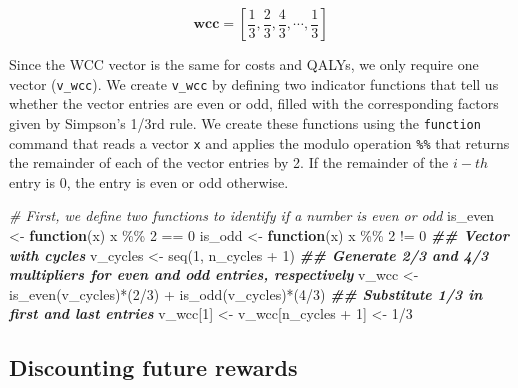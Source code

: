 \documentclass[
]{article}
\newenvironment{Shaded}{\begin{snugshade}}{\end{snugshade}}
\newcommand{\CommentTok}[1]{\textcolor[rgb]{0.56,0.35,0.01}{\textit{#1}}}
\newcommand{\ControlFlowTok}[1]{\textcolor[rgb]{0.13,0.29,0.53}{\textbf{#1}}}
\newcommand{\DecValTok}[1]{\textcolor[rgb]{0.00,0.00,0.81}{#1}}
\newcommand{\DocumentationTok}[1]{\textcolor[rgb]{0.56,0.35,0.01}{\textbf{\textit{#1}}}}
\newcommand{\FunctionTok}[1]{\textcolor[rgb]{0.00,0.00,0.00}{#1}}
\newcommand{\NormalTok}[1]{#1}
\newcommand{\OtherTok}[1]{\textcolor[rgb]{0.56,0.35,0.01}{#1}}
\newcommand{\SpecialCharTok}[1]{\textcolor[rgb]{0.00,0.00,0.00}{#1}}
\begin{document}
\[
  \mathbf{wcc} = \left[\frac{1}{3}, \frac{2}{3}, \frac{4}{3}, \cdots, \frac{1}{3}\right]
\]

Since the WCC vector is the same for costs and QALYs, we only require one vector (\texttt{v\_wcc}). We create \texttt{v\_wcc} by defining two indicator functions that tell us whether the vector entries are even or odd, filled with the corresponding factors given by Simpson's 1/3rd rule. We create these functions using the \texttt{function} command that reads a vector \texttt{x} and applies the modulo operation \texttt{\%\%} that returns the remainder of each of the vector entries by 2. If the remainder of the \(i-th\) entry is 0, the entry is even or odd otherwise.

\begin{Shaded}
\begin{Highlighting}[]
\CommentTok{\# First, we define two functions to identify if a number is even or odd}
\NormalTok{is\_even }\OtherTok{\textless{}{-}} \ControlFlowTok{function}\NormalTok{(x) x }\SpecialCharTok{\%\%} \DecValTok{2} \SpecialCharTok{==} \DecValTok{0}
\NormalTok{is\_odd  }\OtherTok{\textless{}{-}} \ControlFlowTok{function}\NormalTok{(x) x }\SpecialCharTok{\%\%} \DecValTok{2} \SpecialCharTok{!=} \DecValTok{0}
\DocumentationTok{\#\# Vector with cycles}
\NormalTok{v\_cycles }\OtherTok{\textless{}{-}} \FunctionTok{seq}\NormalTok{(}\DecValTok{1}\NormalTok{, n\_cycles }\SpecialCharTok{+} \DecValTok{1}\NormalTok{)}
\DocumentationTok{\#\# Generate 2/3 and 4/3 multipliers for even and odd entries, respectively}
\NormalTok{v\_wcc }\OtherTok{\textless{}{-}} \FunctionTok{is\_even}\NormalTok{(v\_cycles)}\SpecialCharTok{*}\NormalTok{(}\DecValTok{2}\SpecialCharTok{/}\DecValTok{3}\NormalTok{) }\SpecialCharTok{+} \FunctionTok{is\_odd}\NormalTok{(v\_cycles)}\SpecialCharTok{*}\NormalTok{(}\DecValTok{4}\SpecialCharTok{/}\DecValTok{3}\NormalTok{)}
\DocumentationTok{\#\# Substitute 1/3 in first and last entries}
\NormalTok{v\_wcc[}\DecValTok{1}\NormalTok{] }\OtherTok{\textless{}{-}}\NormalTok{ v\_wcc[n\_cycles }\SpecialCharTok{+} \DecValTok{1}\NormalTok{] }\OtherTok{\textless{}{-}} \DecValTok{1}\SpecialCharTok{/}\DecValTok{3}
\end{Highlighting}
\end{Shaded}

\hypertarget{discounting-future-rewards}{%
\subsection{Discounting future rewards}\label{discounting-future-rewards}}
\end{document}
